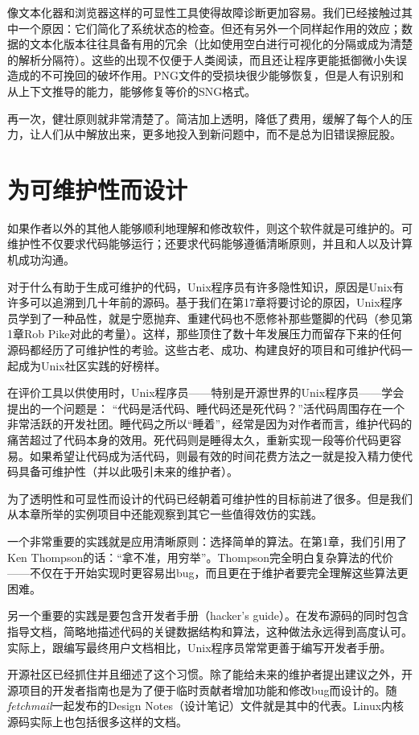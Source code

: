 \documentclass[12pt,oneside]{book}
\begin{document}
像文本化器和浏览器这样的可显性工具使得故障诊断更加容易。我们已经接触过其中一个原因：它们简化了系统状态的检查。但还有另外一个同样起作用的效应；数据的文本化版本往往具备有用的冗余（比如使用空白进行可视化的分隔或成为清楚的解析分隔符）。这些的出现不仅便于人类阅读，而且还让程序更能抵御微小失误造成的不可挽回的破坏作用。PNG文件的受损块很少能够恢复，但是人有识别和从上下文推导的能力，能够修复等价的SNG格式。

再一次，健壮原则就非常清楚了。简洁加上透明，降低了费用，缓解了每个人的压力，让人们从中解放出来，更多地投入到新问题中，而不是总为旧错误擦屁股。

\section{为可维护性而设计}
如果作者以外的其他人能够顺利地理解和修改软件，则这个软件就是可维护的。可维护性不仅要求代码能够运行；还要求代码能够遵循清晰原则，并且和人以及计算机成功沟通。

对于什么有助于生成可维护的代码，Unix程序员有许多隐性知识，原因是Unix有许多可以追溯到几十年前的源码。基于我们在第17章将要讨论的原因，Unix程序员学到了一种品性，就是宁愿抛弃、重建代码也不愿修补那些蹩脚的代码（参见第1章Rob Pike对此的考量）。这样，那些顶住了数十年发展压力而留存下来的任何源码都经历了可维护性的考验。这些古老、成功、构建良好的项目和可维护代码一起成为Unix社区实践的好榜样。

在评价工具以供使用时，Unix程序员——特别是开源世界的Unix程序员——学会提出的一个问题是：  “代码是活代码、睡代码还是死代码？”活代码周围存在一个非常活跃的开发社团。睡代码之所以“睡着”，经常是因为对作者而言，维护代码的痛苦超过了代码本身的效用。死代码则是睡得太久，重新实现一段等价代码更容易。如果希望让代码成为活代码，则最有效的时间花费方法之一就是投入精力使代码具备可维护性（并以此吸引未来的维护者）。

为了透明性和可显性而设计的代码已经朝着可维护性的目标前进了很多。但是我们从本章所举的实例项目中还能观察到其它一些值得效仿的实践。

一个非常重要的实践就是应用清晰原则：选择简单的算法。在第1章，我们引用了Ken Thompson的话：“拿不准，用穷举”。Thompson完全明白复杂算法的代价——不仅在于开始实现时更容易出bug，而且更在于维护者要完全理解这些算法更困难。

另一个重要的实践是要包含开发者手册（hacker's guide）。在发布源码的同时包含指导文档，简略地描述代码的关键数据结构和算法，这种做法永远得到高度认可。实际上，跟编写最终用户文档相比，Unix程序员常常更善于编写开发者手册。

开源社区已经抓住并且细述了这个习惯。除了能给未来的维护者提出建议之外，开源项目的开发者指南也是为了便于临时贡献者增加功能和修改bug而设计的。随\textit{fetchmail}一起发布的Design Notes（设计笔记）文件就是其中的代表。Linux内核源码实际上也包括很多这样的文档。
\end{document}
